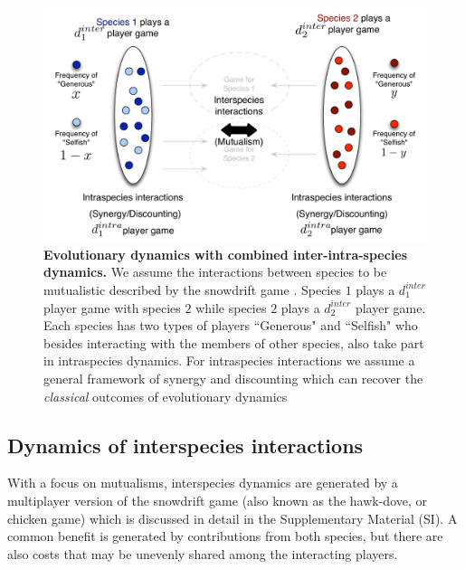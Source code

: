\documentclass[12pt]{article}
\begin{document}
\begin{figure}
\begin{center}
\includegraphics[scale=0.5]{Figures/interintra.pdf}
\caption{\small{
\textbf{Evolutionary dynamics with combined inter-intra-species dynamics.}
We assume the interactions between species to be mutualistic described by the snowdrift game \citep{bergstrom:PNAS:2003,souza:JTB:2009,gokhale:PRSB:2012}.
Species $1$ plays a $d_1^{inter}$ player game with species $2$ while species $2$ plays a $d_2^{inter}$ player game.
Each species has two types of players ``Generous" and ``Selfish" who besides interacting with the members of other species, also take part in intraspecies dynamics.
For intraspecies interactions we assume a general framework of synergy and discounting which can recover the \textit{classical} outcomes of evolutionary dynamics \citep{eshel:AmNat:1988,hauert:JTB:2006a,nowak:book:2006}
}
\label{fig:conceptart}
}
\end{center}
\end{figure}


\subsection{Dynamics of interspecies interactions}

With a focus on mutualisms, interspecies dynamics are generated by a multiplayer version of the snowdrift game (also known as the hawk-dove, or chicken game)\citep{bergstrom:PNAS:2003,souza:JTB:2009,gokhale:PRSB:2012} which is discussed in detail in the Supplementary Material (SI). A common benefit is generated by contributions from both species, but there are also costs that may be unevenly shared among the interacting players.
\end{document}
